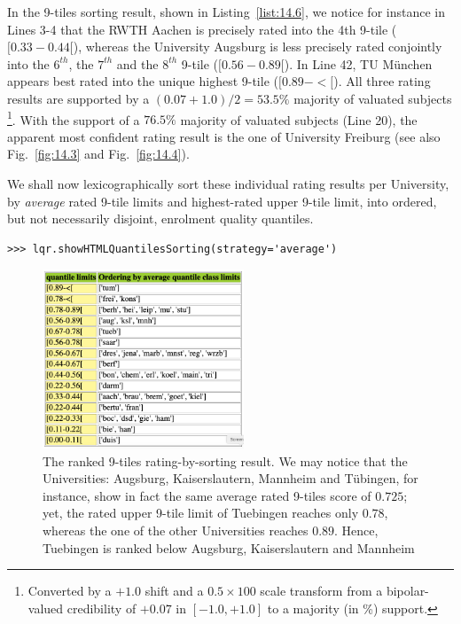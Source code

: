 In the 9-tiles sorting result, shown in Listing~\vref{list:14.6}, we notice for instance in Lines 3-4 that the RWTH Aachen is precisely rated into the 4th 9-tile ($[0.33 - 0.44[$), whereas the University Augsburg is less precisely rated conjointly into the $6^{th}$, the $7^{th}$ and the $8^{th}$ 9-tile ($[0.56 - 0.89[$). In Line 42, TU München appears best rated into the unique highest 9-tile ($[0.89 - <[$). All three rating results are supported by a $(0.07 + 1.0)/2 = 53.5\%$ majority of valuated subjects \footnote{Converted by a $+1.0$ shift and a $0.5 \times 100$ scale transform from a bipolar-valued credibility of $+0.07$ in $[-1.0, +1.0]$ to a majority (in \%) support.}. With the support of a $76.5\%$ majority of valuated subjects (Line 20), the apparent most confident rating result is the one of University Freiburg (see also Fig.~\vref{fig:14.3} and Fig.~\vref{fig:14.4}). 

We shall now lexicographically sort these individual rating results per University, by \emph{average} rated 9-tile limits and highest-rated upper 9-tile limit, into ordered, but not necessarily disjoint, enrolment quality quantiles.
\begin{lstlisting}
>>> lqr.showHTMLQuantilesSorting(strategy='average')
\end{lstlisting}
\begin{figure}[h]
\sidecaption[t]
\includegraphics[width=6cm]{Figures/14-7-nineTilingOrdering.png}
\caption{The ranked 9-tiles rating-by-sorting result. We may notice that the Universities: Augsburg, Kaiserslautern, Mannheim and Tübingen, for instance, show in fact the same average rated 9-tiles score of $0.725$; yet, the rated upper 9-tile limit of Tuebingen reaches only $0.78$, whereas the one of the other Universities reaches $0.89$. Hence, Tuebingen is ranked below Augsburg, Kaiserslautern and Mannheim}
\label{fig:14.7}       %
\end{figure}

